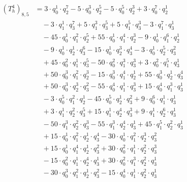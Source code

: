 \begin{align*}(T_{h}^4)_{8,5}&=3\cdot q_0^{1}\cdot q_2^{7}-5\cdot q_0^{3}\cdot q_2^{5}-5\cdot q_0^{5}\cdot q_2^{3}+3\cdot q_0^{7}\cdot q_2^{1}\\
&\quad -3\cdot q_1^{1}\cdot q_3^{7}+5\cdot q_1^{3}\cdot q_3^{5}+5\cdot q_1^{5}\cdot q_3^{3}-3\cdot q_1^{7}\cdot q_3^{1}\\
&\quad -45\cdot q_0^{1}\cdot q_1^{2}\cdot q_2^{5}+55\cdot q_0^{1}\cdot q_1^{4}\cdot q_2^{3}-9\cdot q_0^{1}\cdot q_1^{6}\cdot q_2^{1}\\
&\quad -9\cdot q_0^{1}\cdot q_2^{1}\cdot q_3^{6}-15\cdot q_0^{1}\cdot q_2^{3}\cdot q_3^{4}-3\cdot q_0^{1}\cdot q_2^{5}\cdot q_3^{2}\\
&\quad +45\cdot q_0^{2}\cdot q_1^{1}\cdot q_3^{5}-50\cdot q_0^{2}\cdot q_1^{3}\cdot q_3^{3}+3\cdot q_0^{2}\cdot q_1^{5}\cdot q_3^{1}\\
&\quad +50\cdot q_0^{3}\cdot q_1^{2}\cdot q_2^{3}-15\cdot q_0^{3}\cdot q_1^{4}\cdot q_2^{1}+55\cdot q_0^{3}\cdot q_2^{1}\cdot q_3^{4}\\
&\quad +50\cdot q_0^{3}\cdot q_2^{3}\cdot q_3^{2}-55\cdot q_0^{4}\cdot q_1^{1}\cdot q_3^{3}+15\cdot q_0^{4}\cdot q_1^{3}\cdot q_3^{1}\\
&\quad -3\cdot q_0^{5}\cdot q_1^{2}\cdot q_2^{1}-45\cdot q_0^{5}\cdot q_2^{1}\cdot q_3^{2}+9\cdot q_0^{6}\cdot q_1^{1}\cdot q_3^{1}\\
&\quad +3\cdot q_1^{1}\cdot q_2^{2}\cdot q_3^{5}+15\cdot q_1^{1}\cdot q_2^{4}\cdot q_3^{3}+9\cdot q_1^{1}\cdot q_2^{6}\cdot q_3^{1}\\
&\quad -50\cdot q_1^{3}\cdot q_2^{2}\cdot q_3^{3}-55\cdot q_1^{3}\cdot q_2^{4}\cdot q_3^{1}+45\cdot q_1^{5}\cdot q_2^{2}\cdot q_3^{1}\\
&\quad +15\cdot q_0^{1}\cdot q_1^{2}\cdot q_2^{1}\cdot q_3^{4}-30\cdot q_0^{1}\cdot q_1^{2}\cdot q_2^{3}\cdot q_3^{2}\\
&\quad +15\cdot q_0^{1}\cdot q_1^{4}\cdot q_2^{1}\cdot q_3^{2}+30\cdot q_0^{2}\cdot q_1^{1}\cdot q_2^{2}\cdot q_3^{3}\\
&\quad -15\cdot q_0^{2}\cdot q_1^{1}\cdot q_2^{4}\cdot q_3^{1}+30\cdot q_0^{2}\cdot q_1^{3}\cdot q_2^{2}\cdot q_3^{1}\\
&\quad -30\cdot q_0^{3}\cdot q_1^{2}\cdot q_2^{1}\cdot q_3^{2}-15\cdot q_0^{4}\cdot q_1^{1}\cdot q_2^{2}\cdot q_3^{1}\end{align*}
